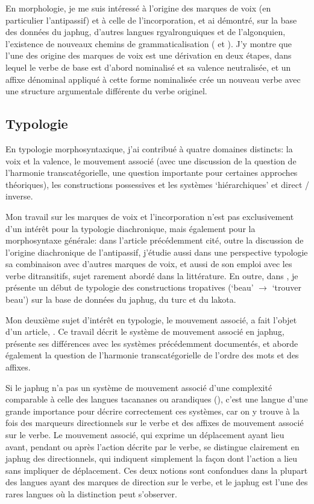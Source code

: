 \documentclass[oldfontcommands,oneside,a4paper,11pt]{article}
\begin{document}
En morphologie, je me suis intéressé à l'origine des marques de voix (en particulier l'antipassif) et à celle de l'incorporation, et ai démontré, sur la base des données du japhug, d'autres langues rgyalronguiques et de l'algonquien, l'existence de nouveaux chemins de grammaticalisation  (\citealt{jacques12incorp} et \citealt{jacques14antipassive}). J'y montre que l'une des origine des marques de voix est une dérivation en deux étapes, dans lequel le verbe de base est d'abord nominalisé et sa valence neutralisée, et  un affixe dénominal appliqué à cette forme nominalisée crée un nouveau verbe avec une structure argumentale différente du verbe originel. 

 
 
\subsection{Typologie}  \label{sec:typologie}
En typologie morphosyntaxique, j'ai contribué à quatre domaines distincts: la voix et la valence, le mouvement associé (avec une discussion de la question de l'harmonie transcatégorielle, une question importante pour certaines approches théoriques), les constructions possessives et les systèmes  `hiérarchiques' et direct / inverse.

Mon travail sur les marques de voix et l'incorporation n'est pas exclusivement d'un intérêt pour la typologie diachronique, mais également pour la morphosyntaxe générale: dans l'article \citet{jacques14antipassive} précédemment cité, outre la discussion de l'origine diachronique de l'antipassif, j'étudie aussi dans une perspective typologie sa combinaison avec d'autres marques de voix, et aussi de son emploi avec les verbe ditransitifs, sujet rarement abordé dans la littérature. En outre, dans \citet{jacques13tropative}, je présente un début de typologie des constructions tropatives (`beau' $\rightarrow$ `trouver beau') sur la base de données du japhug, du turc et du lakota. 

Mon deuxième sujet d'intérêt en typologie, le mouvement associé, a fait l'objet d'un article,  \citet{jacques13harmonization}. Ce travail décrit le système  de mouvement associé en japhug, présente ses différences avec les systèmes précédemment documentés, et aborde également la question de l'harmonie transcatégorielle de l'ordre des mots et des affixes. 

Si  le japhug n'a pas un système de mouvement associé d'une complexité comparable à celle des langues tacananes ou arandiques (\citealt{guillaume09mouv.assoc}), c'est une langue d'une grande importance pour décrire correctement ces systèmes, car on y trouve à la fois des marqueurs directionnels sur le verbe et des affixes de mouvement associé sur le verbe. Le mouvement associé, qui exprime  un déplacement ayant lieu avant, pendant ou après l'action décrite par le verbe, se distingue clairement en japhug  des directionnels, qui indiquent simplement la façon dont l'action a lieu sans impliquer de déplacement. Ces deux notions sont confondues dans la plupart des langues ayant des marques de direction sur le verbe, et le japhug est l'une des rares langues où la distinction peut s'observer.
\end{document}
